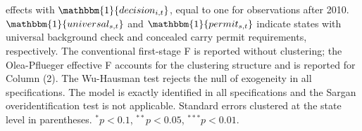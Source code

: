 \begin{table}[!htbp]
\begin{minipage}{\textwidth}
effects with $\mathbbm{1}\{decision_{i,t}\}$, equal to one for observations 
after 2010. $\mathbbm{1}\{universal_{s,t}\}$ and $\mathbbm{1}\{permit_{s,t}\}$ 
indicate states with universal background check and concealed carry permit 
requirements, respectively. The conventional first-stage F is reported without clustering; 
the Olea-Pflueger effective F accounts for the clustering structure and is 
reported for Column (2). The Wu-Hausman test rejects the null of exogeneity 
in all specifications. The model is exactly identified in all specifications and the Sargan 
overidentification test is not applicable. Standard errors clustered at the 
state level in parentheses. $^{*}p<0.1$, $^{**}p<0.05$, $^{***}p<0.01$.
\end{minipage}
\end{table}